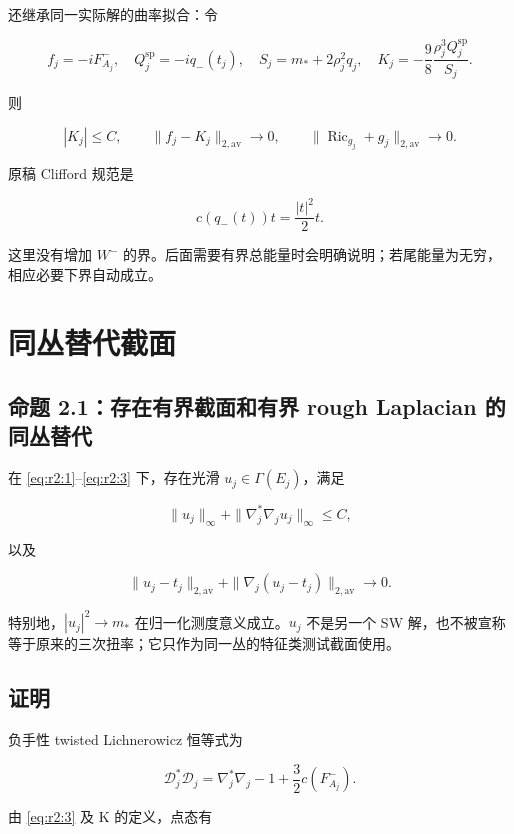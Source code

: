 \documentclass[UTF8,11pt,fontset=none]{ctexart}
\begin{document}
还继承同一实际解的曲率拟合：令

\[
 f_j=-iF_{A_j}^-,\quad Q_j^{\mathrm{sp}}=-i q_-(t_j),\quad
 S_j=m_*+2\rho_j^2q_j,\quad
 K_j=-\frac98\frac{\rho_j^3Q_j^{\mathrm{sp}}}{S_j}.
\]

则

\[
 |K_j|\le C,\qquad
 \|f_j-K_j\|_{2,\mathrm{av}}\to0,
 \qquad \|\operatorname{Ric}_{g_j}+g_j\|_{2,\mathrm{av}}\to0.
 \tag{2.2}\label{eq:r2:2}
\]

原稿 Clifford 规范是

\[
 c(q_-(t))t=\frac{|t|^2}{2}t.
 \tag{2.3}\label{eq:r2:3}
\]

这里没有增加 \(W^-\) 的界。后面需要有界总能量时会明确说明；若尾能量为无穷，相应必要下界自动成立。

\section{同丛替代截面}\label{ch2:ux540cux4e1bux66ffux4ee3ux622aux9762}

\subsection{命题 2.1：存在有界截面和有界 rough Laplacian 的同丛替代}\label{ch2:ux547dux9898-2.1ux5b58ux5728ux6709ux754cux622aux9762ux548cux6709ux754c-rough-laplacian-ux7684ux540cux4e1bux66ffux4ee3}

在 \eqref{eq:r2:1}--\eqref{eq:r2:3} 下，存在光滑 \(u_j\in\Gamma(E_j)\)，满足

\[
 \|u_j\|_\infty+\|\nabla_j^*\nabla_j u_j\|_\infty\le C,
 \tag{2.4}\label{eq:r2:4}
\]

以及

\[
 \|u_j-t_j\|_{2,\mathrm{av}}+
 \|\nabla_j(u_j-t_j)\|_{2,\mathrm{av}}\longrightarrow0.
 \tag{2.5}\label{eq:r2:5}
\]

特别地，\(|u_j|^2\to m_*\) 在归一化测度意义成立。\(u_j\) 不是另一个 SW 解，也不被宣称等于原来的三次扭率；它只作为同一丛的特征类测试截面使用。

\subsection{证明}\label{ch2:ux8bc1ux660e}

负手性 twisted Lichnerowicz 恒等式为

\[
 \mathcal D_j^*\mathcal D_j
 =\nabla_j^*\nabla_j-1+\frac32c(F_{A_j}^-).
\]

由 \eqref{eq:r2:3} 及 K 的定义，点态有
\end{document}
